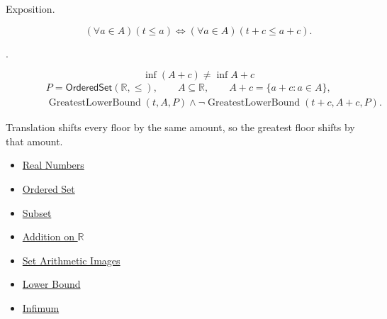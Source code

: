 \begin{remark*}
\begin{description}
  \item[Exposition.]
\[
(\forall a\in A)(t\leq a)
\Longleftrightarrow
(\forall a\in A)(t+c\leq a+c).
\]


  \item[.]
  \[
\inf(A+c)\neq\inf A+c
\]
\[
\begin{aligned}
&P=\mathsf{OrderedSet}(\mathbb{R},\leq),\qquad A\subseteq\mathbb{R},\qquad A+c=\{a+c:a\in A\},\\
&\operatorname{GreatestLowerBound}(t,A,P)\land
\neg\operatorname{GreatestLowerBound}(t+c,A+c,P).
\end{aligned}
\]
\end{description}
\end{remark*}

\begin{remark*}[Interpretation]
Translation shifts every floor by the same amount, so the greatest floor shifts
by that amount.
\end{remark*}

\begin{dependencies}
\begin{itemize}
  \item \hyperref[def:reals]{Real Numbers}
  \item \hyperref[def:ordered-set]{Ordered Set}
  \item \hyperref[def:subset]{Subset}
  \item \hyperref[def:addition-on-r]{Addition on $\mathbb{R}$}
  \item \hyperref[def:set-arithmetic-images]{Set Arithmetic Images}
  \item \hyperref[def:real-lower-bound]{Lower Bound}
  \item \hyperref[def:infimum]{Infimum}
\end{itemize}
\end{dependencies}



